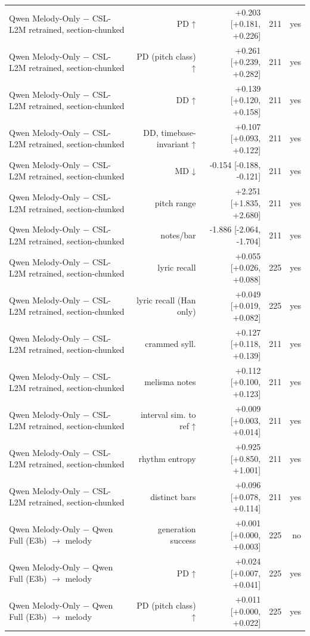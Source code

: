 \begin{table}[t]
\begin{tabular}{lrrrr}
Qwen Melody-Only $-$ CSL-L2M retrained, section-chunked & PD ↑ & +0.203 [+0.181, +0.226] & 211 & yes \\
Qwen Melody-Only $-$ CSL-L2M retrained, section-chunked & PD (pitch class) ↑ & +0.261 [+0.239, +0.282] & 211 & yes \\
Qwen Melody-Only $-$ CSL-L2M retrained, section-chunked & DD ↑ & +0.139 [+0.120, +0.158] & 211 & yes \\
Qwen Melody-Only $-$ CSL-L2M retrained, section-chunked & DD, timebase-invariant ↑ & +0.107 [+0.093, +0.122] & 211 & yes \\
Qwen Melody-Only $-$ CSL-L2M retrained, section-chunked & MD ↓ & -0.154 [-0.188, -0.121] & 211 & yes \\
Qwen Melody-Only $-$ CSL-L2M retrained, section-chunked & pitch range & +2.251 [+1.835, +2.680] & 211 & yes \\
Qwen Melody-Only $-$ CSL-L2M retrained, section-chunked & notes/bar & -1.886 [-2.064, -1.704] & 211 & yes \\
Qwen Melody-Only $-$ CSL-L2M retrained, section-chunked & lyric recall & +0.055 [+0.026, +0.088] & 225 & yes \\
Qwen Melody-Only $-$ CSL-L2M retrained, section-chunked & lyric recall (Han only) & +0.049 [+0.019, +0.082] & 225 & yes \\
Qwen Melody-Only $-$ CSL-L2M retrained, section-chunked & crammed syll. & +0.127 [+0.118, +0.139] & 211 & yes \\
Qwen Melody-Only $-$ CSL-L2M retrained, section-chunked & melisma notes & +0.112 [+0.100, +0.123] & 211 & yes \\
Qwen Melody-Only $-$ CSL-L2M retrained, section-chunked & interval sim. to ref ↑ & +0.009 [+0.003, +0.014] & 211 & yes \\
Qwen Melody-Only $-$ CSL-L2M retrained, section-chunked & rhythm entropy & +0.925 [+0.850, +1.001] & 211 & yes \\
Qwen Melody-Only $-$ CSL-L2M retrained, section-chunked & distinct bars & +0.096 [+0.078, +0.114] & 211 & yes \\
Qwen Melody-Only $-$ Qwen Full (E3b) $\rightarrow$ melody & generation success & +0.001 [+0.000, +0.003] & 225 & no \\
Qwen Melody-Only $-$ Qwen Full (E3b) $\rightarrow$ melody & PD ↑ & +0.024 [+0.007, +0.041] & 225 & yes \\
Qwen Melody-Only $-$ Qwen Full (E3b) $\rightarrow$ melody & PD (pitch class) ↑ & +0.011 [+0.000, +0.022] & 225 & yes \\

\end{tabular}
\end{table}
